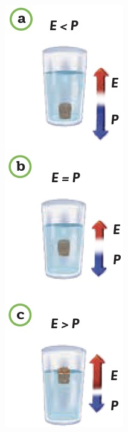 \documentclass[11pt]{book}
\begin{document}
\begin{minipage}[t]{0.3\textwidth}
    \begin{figure}[H]
        \centering
        \includegraphics[width=0.6\linewidth]{vaso_arquimedes.jpg}
        \label{fig:vaso_arquimedes}
    \end{figure}
\end{minipage}\hfill
\end{document}

